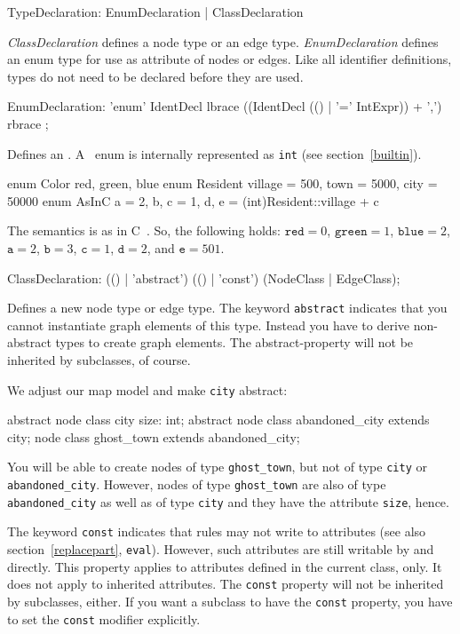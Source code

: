 \begin{rail}
  TypeDeclaration: EnumDeclaration | ClassDeclaration
\end{rail}
\emph{ClassDeclaration} defines a node type or an edge type. \emph{EnumDeclaration} defines an enum type for use as attribute of nodes or edges. Like all identifier definitions, types do not need to be declared before they are used.

\begin{rail}
  EnumDeclaration: 'enum' IdentDecl lbrace ((IdentDecl (() | '=' IntExpr)) + ',') rbrace ;
\end{rail}
Defines an .
A \GrG\ enum is internally represented as \texttt{int} (see section~\ref{builtin}).

\begin{example}
\begin{grgen}
enum Color {red, green, blue}
enum Resident {village = 500, town = 5000, city = 50000}
enum AsInC {a = 2, b, c = 1, d, e = (int)Resident::village + c}
\end{grgen}
The semantics is as in C~\cite{Sch:1990:ANSIC}. So, the following holds: $\texttt{red} = 0$, $\texttt{green} = 1$, $\texttt{blue} = 2$, $\texttt{a}=2$, $\texttt{b}=3$, $\texttt{c}=1$, $\texttt{d}=2$, and $\texttt{e}=501$.
\end{example}

\begin{rail}  
  ClassDeclaration: (() | 'abstract') (() | 'const') (NodeClass | EdgeClass);
\end{rail}
Defines a new node type or edge type. The keyword \texttt{abstract} indicates that you cannot instantiate graph elements of this type. Instead you have to derive non-abstract types to create graph elements. The abstract-property will not be inherited by subclasses, of course.

\begin{example}
We adjust our map model and make \texttt{city} abstract:
\begin{grgen}
abstract node class city {
	size: int;
}
abstract node class abandoned_city extends city;
node class ghost_town extends abandoned_city;
\end{grgen}
You will be able to create nodes of type \texttt{ghost\_town}, but not of type \texttt{city} or \texttt{abandoned\_city}. However, nodes of type \texttt{ghost\_town} are also of type \texttt{abandoned\_city} as well as of type \texttt{city} and they have the attribute \texttt{size}, hence.
\end{example}
The keyword \texttt{const} indicates that rules may not write to attributes (see also section~\ref{replacepart}, \texttt{eval}). However, such attributes are still writable by \LibGr{} and \GrShell{} directly. This property applies to attributes defined in the current class, only. It does not apply to inherited attributes. The \texttt{const} property will not be inherited by subclasses, either. If you want a subclass to have the \texttt{const} property, you have to set the \texttt{const} modifier explicitly.

